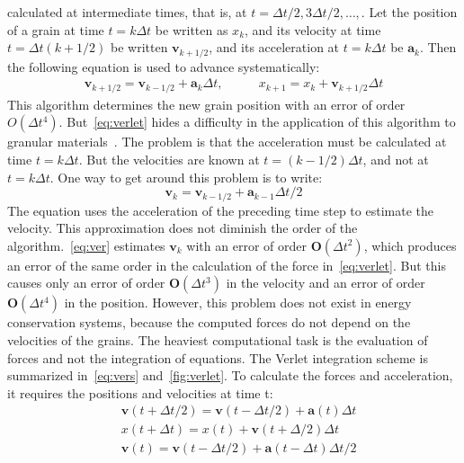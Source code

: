 calculated at 
intermediate times, that is, at $t=\Delta t/2, 3 \Delta t/2, \dots,$. Let the 
position of a grain 
at time $t=k\Delta t$ be written as $x_{\mathit{k}}$, and its velocity at time 
$t=\Delta t (k + 
1/2)$ be written $\mathbf{v}_{\mathit{k + 1/2}}$, and its acceleration at $t=k 
\Delta t$ be 
$\mathbf{a}_{\mathit{k}}$. Then the following equation is used to advance 
systematically:
%
\begin{align}\label{eq:verlet}
\mathbf{v}_{\mathit{k}+1/2}=\mathbf{v}_{\mathit{k}-1/2}+\mathbf{a}_{\mathit{k}}
 \Delta t, \qquad & 
x_{\mathit{k}+1}=x_{\mathit{k}}+\mathbf{v}_{\mathit{k}+1/2} \Delta t
\end{align}
%
This algorithm determines the new grain position with an error of order 
$\mathit{O}( \Delta 
t^{4})$. But~\cref{eq:verlet} hides a difficulty in the application of this 
algorithm to 
granular materials~\citep{Radjai2011}. The problem is that the acceleration 
must be calculated at 
time $t=k\Delta t$. But the velocities are known at $t=(k - 1/2) \Delta t$, 
and not at $t=k \Delta 
t$. One way to get around this problem is to write:
%
\begin{equation} 
\mathbf{v}_{\mathit{k}}={\mathbf{v}_{\mathit{k}-1/2}+{\mathbf{a}_{\mathit{k}-1}\Delta
 t/2}}
\label{eq:ver}
\end{equation}
%
The equation uses the acceleration of the preceding time step to estimate the 
velocity. This 
approximation does not diminish the order of the algorithm.~\cref{eq:ver} 
estimates 
$\mathbf{v}_{k}$ with an error of order $\mathbf{O}(\Delta t^{2})$, which 
produces an error of the 
same order in the calculation of the force in~\cref{eq:verlet}. But this 
causes only an error of 
order $\mathbf{O}(\Delta t^{3})$ in the velocity and an error of order 
$\mathbf{O}(\Delta t^{4})$ 
in the position. However, this problem does not exist in energy conservation 
systems, because the 
computed forces do not depend on the velocities of the grains. The heaviest 
computational task is 
the evaluation of forces and not the integration of equations. The Verlet 
integration scheme is 
summarized in~\cref{eq:vers} and~\cref{fig:verlet}. To calculate the forces 
and 
acceleration, it requires the positions and velocities at time t:
%
\begin{align}
& \mathbf{v}(t+\Delta t/2)=\mathbf{v}(t-\Delta t/2) + \mathbf{a}(t) \Delta t 
\nonumber \\
& x(t+\Delta t)=x(t)+\mathbf{v}(t+\Delta /2) \Delta t \nonumber \\
& \mathbf{v}(t)=\mathbf{v}(t-\Delta t /2)+\mathbf{a}(t- \Delta t) \Delta t /2
\label{eq:vers}
\end{align}

